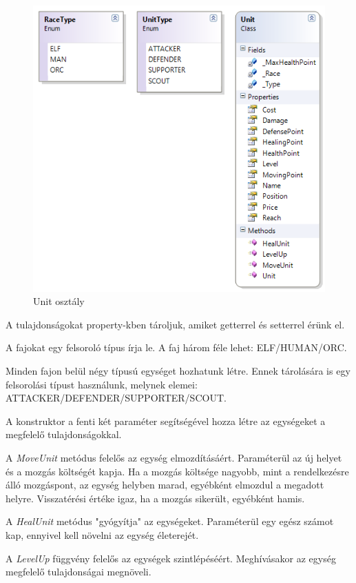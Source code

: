 \documentclass[a4paper,12pt]{report}
\begin{document}
\begin{figure}[hbtp]
\centering
\includegraphics[width=1\textwidth]{Unit.png}
\caption{Unit osztály}
\label{fig:unitclass}
\end{figure}

A tulajdonságokat property-kben tároljuk, amiket getterrel és setterrel érünk el.

A fajokat egy felsoroló típus írja le. A faj három féle lehet: ELF/HUMAN/ORC.

Minden fajon belül négy típusú egységet hozhatunk létre. Ennek tárolására is egy felsorolási típust használunk, melynek elemei: ATTACKER/DEFENDER/SUPPORTER/SCOUT.

A konstruktor a fenti két paraméter segítségével hozza létre az egységeket a megfelelő tulajdonságokkal.

A \textit{MoveUnit} metódus felelős az egység elmozdításáért. Paraméterül az új helyet és a mozgás költségét kapja. Ha a mozgás költsége nagyobb, mint a rendelkezésre álló mozgáspont, az egység helyben marad, egyébként elmozdul a megadott helyre. Visszatérési értéke igaz, ha a mozgás sikerült, egyébként hamis.

A \textit{HealUnit} metódus "gyógyítja" az egységeket. Paraméterül egy egész számot kap, ennyivel kell növelni az egység életerejét.

A \textit{LevelUp} függvény felelős az egységek szintlépéséért. Meghívásakor az egység megfelelő tulajdonságai megnöveli.
\end{document}
